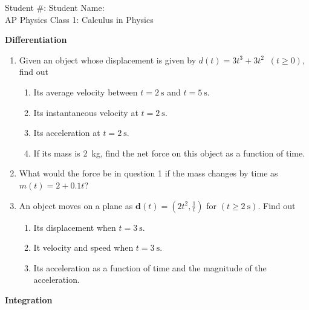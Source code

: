 \documentclass[12pt]{article}
\newcommand{\mb}[1]{\mathbf{#1}}
\begin{document}
\pagestyle{empty}
\begin{center}
  Student \#: \underline{\hspace{1in}}\hspace{1.9in}
  Student Name: \underline{\hspace{2in}}\\
  \vspace{0.3in}
  {\LARGE
    AP Physics \hspace{0.5in}
    Class 1: Calculus in Physics
  }
\end{center}

\textbf{Differentiation}

\begin{enumerate}
\item Given an object whose displacement is given by
  $d(t)=3t^3+3t^2\;\;(t\geq 0)$, find out
  \begin{enumerate}[noitemsep,topsep=0pt]
  \item Its average velocity between $t=\SI{2}{\s}$ and $t=\SI{5}{\s}$.
  \item Its instantaneous velocity at $t=\SI{2}{\s}$.
  \item Its acceleration at $t=\SI{2}{\s}$.
  \item If its mass is \SI{2}{\kg}, find the net force on this object as a
    function of time.
  \end{enumerate}

\item What would the force be in question 1 if the mass changes by time as
  $m(t)=2+0.1t$?

\item An object moves on a plane as $\mb{d}(t)=\left(2t^2,\frac{1}{t}\right)$
  for $(t\geq\SI{2}{\s})$. Find out
  \begin{enumerate}[noitemsep,topsep=0pt]
  \item Its displacement when $t=\SI{3}{\s}$.
  \item It velocity and speed when $t=\SI{3}{\s}$.
  \item Its acceleration as a function of time and the magnitude of the
    acceleration.
  \end{enumerate}
\end{enumerate}

\textbf{Integration}
\end{document}
